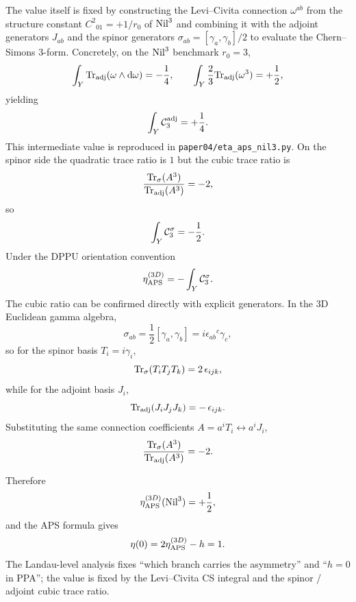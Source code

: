 The value itself is fixed by constructing the Levi--Civita connection
$\omega^{ab}$ from the structure constant $C^2{}_{01} = +1/r_0$ of
$\mathrm{Nil}^3$ and combining it with the adjoint generators $J_{ab}$ and the
spinor generators $\sigma_{ab} = [\gamma_a, \gamma_b]/2$ to evaluate the
Chern--Simons 3-form.  Concretely, on the $\mathrm{Nil}^3$ benchmark $r_0 = 3$,
\begin{equation}
  \int_Y \mathrm{Tr}_{\mathrm{adj}}(\omega\wedge \mathrm{d}\omega) = -\frac{1}{4},
  \qquad
  \int_Y \frac{2}{3}\mathrm{Tr}_{\mathrm{adj}}(\omega^3) = +\frac{1}{2},
\end{equation}
yielding
\begin{equation}
  \int_Y \mathcal{C}_3^{\mathrm{adj}} = +\frac{1}{4}.
\end{equation}
This intermediate value is reproduced in
\texttt{paper04/eta\_aps\_nil3.py}.  On the spinor side the quadratic trace
ratio is $1$ but the cubic trace ratio is
\begin{equation}
  \frac{\mathrm{Tr}_\sigma(A^3)}{\mathrm{Tr}_{\mathrm{adj}}(A^3)} = -2,
\end{equation}
so
\begin{equation}
  \int_Y \mathcal{C}_3^{\sigma} = -\frac{1}{2}.
\end{equation}
Under the DPPU orientation convention
\begin{equation}
  \eta_{\mathrm{APS}}^{(3D)} = -\int_Y \mathcal{C}_3^{\sigma}.
\end{equation}
The cubic ratio can be confirmed directly with explicit generators.  In the
3D Euclidean gamma algebra,
\begin{equation}
  \sigma_{ab} = \frac{1}{2}[\gamma_a, \gamma_b] = i\epsilon_{ab}{}^c \gamma_c,
\end{equation}
so for the spinor basis $T_i = i\gamma_i$,
\begin{equation}
  \mathrm{Tr}_\sigma(T_i T_j T_k) = 2\,\epsilon_{ijk},
\end{equation}
while for the adjoint basis $J_i$,
\begin{equation}
  \mathrm{Tr}_{\mathrm{adj}}(J_i J_j J_k) = -\,\epsilon_{ijk}.
\end{equation}
Substituting the same connection coefficients
$A = a^i T_i\leftrightarrow a^i J_i$,
\begin{equation}
  \frac{\mathrm{Tr}_\sigma(A^3)}{\mathrm{Tr}_{\mathrm{adj}}(A^3)} = -2.
\end{equation}

Therefore
\begin{equation}
  \eta_{\mathrm{APS}}^{(3D)}(\mathrm{Nil}^3) = +\frac{1}{2},
\end{equation}
and the APS formula gives
\begin{equation}
  \eta(0) = 2\eta_{\mathrm{APS}}^{(3D)} - h = 1.
\end{equation}
The Landau-level analysis fixes ``which branch carries the asymmetry'' and
``$h = 0$ in PPA''; the value is fixed by the Levi--Civita CS integral and
the spinor / adjoint cubic trace ratio.

